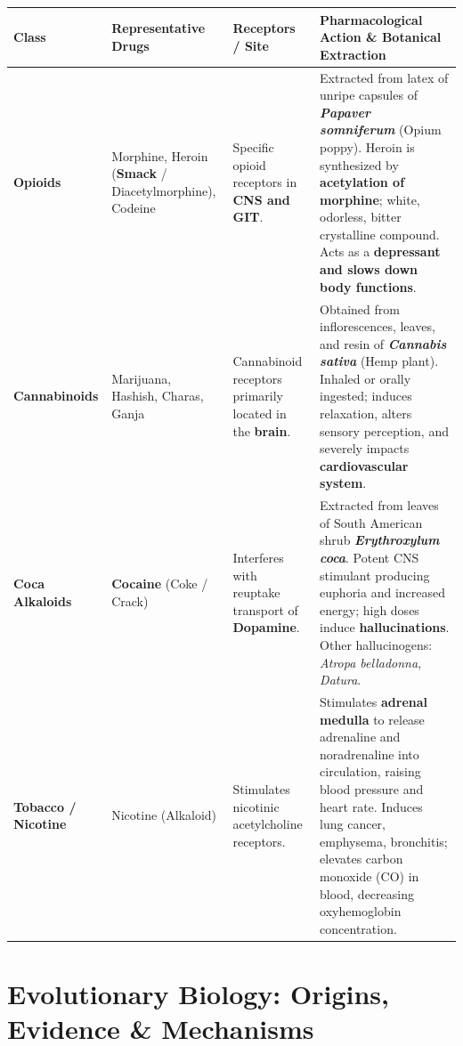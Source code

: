 \documentclass[10pt,a4paper]{article}
\begin{document}
\begin{conceptbox}
\begin{center}
\scriptsize
\begin{tabular}{|p{1.8cm}|p{2.5cm}|p{2.5cm}|p{7.5cm}|}
\hline
\textbf{Class} & \textbf{Representative Drugs} & \textbf{Receptors / Site} & \textbf{Pharmacological Action \& Botanical Extraction} \\
\hline
\textbf{Opioids} & Morphine, Heroin (\textbf{Smack} / Diacetylmorphine), Codeine & Specific opioid receptors in \textbf{CNS and GIT}. & Extracted from latex of unripe capsules of \textbf{\textit{Papaver somniferum}} (Opium poppy). Heroin is synthesized by \textbf{acetylation of morphine}; white, odorless, bitter crystalline compound. Acts as a \textbf{depressant and slows down body functions}. \\
\hline
\textbf{Cannabinoids} & Marijuana, Hashish, Charas, Ganja & Cannabinoid receptors primarily located in the \textbf{brain}. & Obtained from inflorescences, leaves, and resin of \textbf{\textit{Cannabis sativa}} (Hemp plant). Inhaled or orally ingested; induces relaxation, alters sensory perception, and severely impacts \textbf{cardiovascular system}. \\
\hline
\textbf{Coca Alkaloids} & \textbf{Cocaine} (Coke / Crack) & Interferes with reuptake transport of \textbf{Dopamine}. & Extracted from leaves of South American shrub \textbf{\textit{Erythroxylum coca}}. Potent CNS stimulant producing euphoria and increased energy; high doses induce \textbf{hallucinations}. Other hallucinogens: \textit{Atropa belladonna}, \textit{Datura}. \\
\hline
\textbf{Tobacco / Nicotine} & Nicotine (Alkaloid) & Stimulates nicotinic acetylcholine receptors. & Stimulates \textbf{adrenal medulla} to release adrenaline and noradrenaline into circulation, raising blood pressure and heart rate. Induces lung cancer, emphysema, bronchitis; elevates carbon monoxide ($\mathrm{CO}$) in blood, decreasing oxyhemoglobin concentration. \\
\hline
\end{tabular}
\end{center}
\end{conceptbox}

\section{Evolutionary Biology: Origins, Evidence \& Mechanisms}
\end{document}
